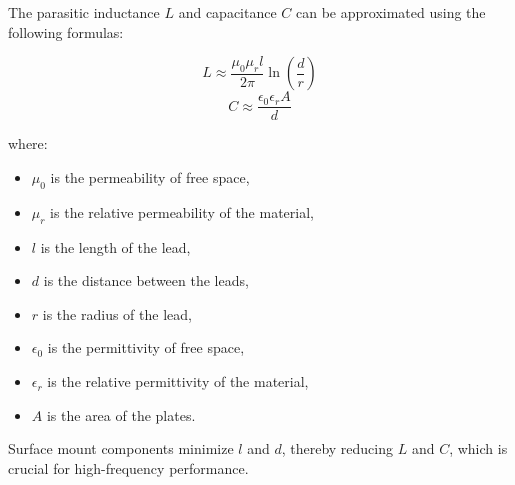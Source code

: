The parasitic inductance \( L \) and capacitance \( C \) can be approximated using the following formulas:

\[ L \approx \frac{\mu_0 \mu_r l}{2\pi} \ln\left(\frac{d}{r}\right) \]
\[ C \approx \frac{\epsilon_0 \epsilon_r A}{d} \]

where:
\begin{itemize}
    \item \( \mu_0 \) is the permeability of free space,
    \item \( \mu_r \) is the relative permeability of the material,
    \item \( l \) is the length of the lead,
    \item \( d \) is the distance between the leads,
    \item \( r \) is the radius of the lead,
    \item \( \epsilon_0 \) is the permittivity of free space,
    \item \( \epsilon_r \) is the relative permittivity of the material,
    \item \( A \) is the area of the plates.
\end{itemize}

Surface mount components minimize \( l \) and \( d \), thereby reducing \( L \) and \( C \), which is crucial for high-frequency performance.

